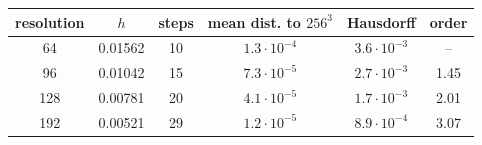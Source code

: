 \begin{tabular}{cccccc}
\toprule
resolution & $h$ & steps & mean dist. to $256^3$ & Hausdorff & order \\
\midrule
64 & 0.01562 & 10 & $1.3\cdot 10^{-4}$ & $3.6\cdot 10^{-3}$ & -- \\
96 & 0.01042 & 15 & $7.3\cdot 10^{-5}$ & $2.7\cdot 10^{-3}$ & 1.45 \\
128 & 0.00781 & 20 & $4.1\cdot 10^{-5}$ & $1.7\cdot 10^{-3}$ & 2.01 \\
192 & 0.00521 & 29 & $1.2\cdot 10^{-5}$ & $8.9\cdot 10^{-4}$ & 3.07 \\
\bottomrule
\end{tabular}
